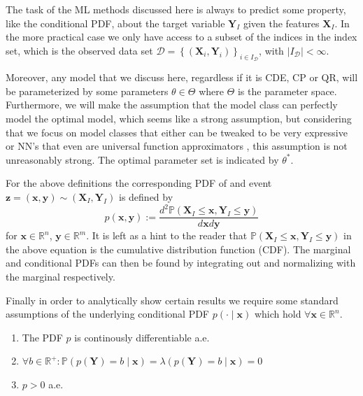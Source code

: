 The task of the ML methods discussed here is always to predict some property, like the conditional PDF, about the target variable $\mathbf{Y}_I$ given the features $\mathbf{X}_I$. %
In the more practical case we only have access to a subset of the indices in the index set, which is the observed data set $\mathcal{D} = \left\{(\mathbf{X}_i, \mathbf{Y}_i)\right\}_{i\in I_{\mathcal{D}}}$, with $|I_{\mathcal{D}}| < \infty$.

Moreover, any model that we discuss here, regardless if it is CDE, CP or QR, will be parameterized by some parameters $\theta \in \Theta$ where $\Theta$ is the parameter space. Furthermore, we will make the assumption that the model class can perfectly model the optimal model, which seems like a strong assumption, but considering that we focus on model classes that either can be tweaked to be very expressive or NN's that even are universal function approximators \cite{HORNIK1989359}, this assumption is not unreasonably strong. The optimal parameter set is indicated by $\theta^*$.

For the above definitions the corresponding PDF of and event $\mathbf{z} = (\mathbf{x}, \mathbf{y}) \sim (\mathbf{X}_I, \mathbf{Y}_I)$ is defined by
\begin{equation}
    p(\mathbf{x}, \mathbf{y}):=\frac{d^2 \mathbb{P}(\mathbf{X}_I \leq
        \mathbf{x}, \mathbf{Y}_I \leq \mathbf{y})}{d \mathbf{x} d \mathbf{y}}
\end{equation}
for $\mathbf{x} \in \mathbb{R}^n$, $\mathbf{y}\in\mathbb{R}^m$. It is left as a hint to the reader that $\mathbb{P}(\mathbf{X}_I \leq
    \mathbf{x}, \mathbf{Y}_I \leq \mathbf{y})$ in the above equation is the cumulative distribution function (CDF). The marginal and conditional PDFs can then be found by integrating out and normalizing with the marginal respectively.

Finally in order to analytically show certain results we require some standard assumptions of the underlying conditional PDF $p(\cdot\mid \mathbf{x})$ which hold $\forall \mathbf{x}\in \mathbb{R}^n$.

\begin{definition}\label{def:assumptions} %

    \begin{enumerate}
        \item The PDF $p$ is continously differentiable a.e.
        \item $\forall b\in\mathbb{R}^+: \mathbb{P}(p(\mathbf{Y}) = b\mid \mathbf{x}) = \lambda(p(\mathbf{Y}) = b \mid \mathbf{x}) = 0$
        \item $p > 0$ a.e.
    \end{enumerate}
\end{definition}

